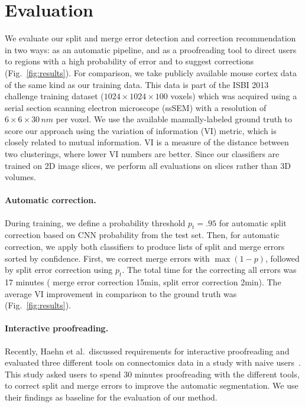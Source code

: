 \section{Evaluation}

We evaluate our split and merge error detection and correction recommendation in two ways: as an automatic pipeline, and as a proofreading tool to direct users to regions with a high probability of error and to suggest corrections (Fig.~\ref{fig:results}). For comparison, we take publicly available mouse cortex data of the same kind as our training data. This data is part of the ISBI 2013 challenge training dataset ($1024\times1024\times100$ voxels) which was acquired using a serial section scanning electron microscope (ssSEM) with a resolution of $6\times6\times30\, nm$ per voxel. We use the available manually-labeled ground truth to score our approach using the variation of information (VI) metric, which is closely related to mutual information. VI is a measure of the distance between two clusterings, where lower VI numbers are better. Since our classifiers are trained on 2D image slices, we perform all evaluations on slices rather than 3D volumes. 

\paragraph{Automatic correction.} During training, we define a probability threshold $p_t=.95$  for automatic split correction based on CNN probability from the test set. Then, for automatic correction, we apply both classifiers to produce lists of split and merge errors sorted by confidence. First, we correct merge errors with $\max(1-p)$, followed by split error correction using $p_t$. The total time for the correcting all \JT{\#} errors was 17 minutes (\JT{\#} merge error correction 15min, \JT{\#} split error correction 2min). The average VI improvement in comparison to the ground truth was  (Fig.~\ref{fig:results}).

\paragraph{Interactive proofreading.}
Recently, Haehn et al.~discussed requirements for interactive proofreading and evaluated three different tools on connectomics data in a study with naive users~\cite{haehn_dojo_2014}. %
This study asked users to spend 30 minutes proofreading with the different tools, to correct split and merge errors to improve the automatic segmentation. We use their findings as baseline for the evaluation of our method.

